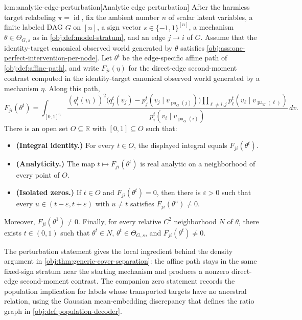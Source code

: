 \begin{lemmav}{lem:analytic-edge-perturbation}[Analytic edge perturbation]
After the harmless target relabeling \(\pi=\operatorname{id}\), fix the ambient number \(n\) of scalar latent variables, a finite labeled DAG \(G\) on \([n]\), a sign vector \(s\in\{-1,1\}^{[n]}\), a mechanism \(\theta\in\Theta_{G,s}\) as in \cref{obj:def:model-stratum}, and an edge \(j\to i\) of \(G\). Assume that the identity-target canonical observed world generated by \(\theta\) satisfies \cref{obj:ass:one-perfect-intervention-per-node}. Let \(\theta^t\) be the edge-specific affine path of \cref{obj:def:affine-path}, and write \(F_{ji}(\eta)\) for the direct-edge second-moment contrast computed in the identity-target canonical observed world generated by a mechanism \(\eta\). Along this path,
\[
F_{ji}(\theta^t)
=
\int_{[0,1]^n}
\frac{(q_i^t(v_i))^2\bigl(q_j^t(v_j)-p_j^t(v_j\mid v_{\operatorname{pa}_G(j)})\bigr)
\prod_{\ell\ne i,j}p_\ell^t(v_\ell\mid v_{\operatorname{pa}_G(\ell)})}
{p_i^t(v_i\mid v_{\operatorname{pa}_G(i)})}
\,dv .
\]
There is an open set \(O\subseteq\mathbb R\) with \([0,1]\subseteq O\) such that:
\begin{itemize}
\item \textbf{(Integral identity.)} For every \(t\in O\), the displayed integral equals \(F_{ji}(\theta^t)\).
\item \textbf{(Analyticity.)} The map \(t\mapsto F_{ji}(\theta^t)\) is real analytic on a neighborhood of every point of \(O\).
\item \textbf{(Isolated zeros.)} If \(t\in O\) and \(F_{ji}(\theta^t)=0\), then there is \(\varepsilon>0\) such that every \(u\in(t-\varepsilon,t+\varepsilon)\) with \(u\ne t\) satisfies \(F_{ji}(\theta^u)\ne0\).
\end{itemize}
Moreover, \(F_{ji}(\theta^1)\ne0\). Finally, for every relative \(C^2\) neighborhood \(N\) of \(\theta\), there exists \(t\in(0,1)\) such that \(\theta^t\in N\), \(\theta^t\in\Theta_{G,s}\), and \(F_{ji}(\theta^t)\ne0\).
\end{lemmav}

The perturbation statement gives the local ingredient behind the density argument in \cref{obj:thm:generic-cover-separation}: the affine path stays in the same fixed-sign stratum near the starting mechanism and produces a nonzero direct-edge second-moment contrast. The companion zero statement records the population implication for labels whose transported targets have no ancestral relation, using the Gaussian mean-embedding discrepancy that defines the ratio graph in \cref{obj:def:population-decoder}.

